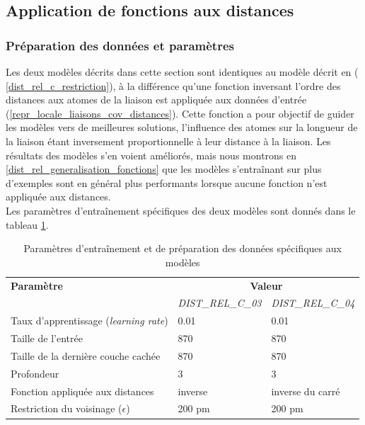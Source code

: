 \subsection{Application de fonctions aux distances}

\label{dist_rel_c_fun}

\subsubsection{Préparation des données et paramètres}
Les deux modèles décrits dans cette section sont identiques au modèle décrit en ( \ref{dist_rel_c_restriction}), à la différence qu'une fonction inversant l'ordre des distances aux atomes de la liaison est appliquée aux données d'entrée (\ref{repr_locale_liaisons_cov_distances}). Cette fonction a pour objectif de guider les modèles vers de meilleures solutions, l'influence des atomes sur la longueur de la liaison étant inversement proportionnelle à leur distance à la liaison. Les résultats des modèles s'en voient améliorés, mais nous montrons en \ref{dist_rel_generalisation_fonctions} que les modèles s'entraînant sur plus d'exemples sont en général plus performants lorsque aucune fonction n'est appliquée aux distances.\\
Les paramètres d'entraînement spécifiques des deux modèles sont donnés dans le tableau \ref{tparams_dist_rel_c_023}.

\begin{table}

	\centering
	\begin{tabular}{|l|l|l|}
		\hline
		\textbf{Paramètre} & \multicolumn{2}{|c|}{\textbf{Valeur}} \\ 
		 & \emph{DIST\_REL\_C\_03} & \emph{DIST\_REL\_C\_04} \\ \hline
		Taux d'apprentissage (\emph{learning rate}) & 0.01 & 0.01\\ \hline
		Taille de l'entrée & 870 & 870\\ \hline
		Taille de la dernière couche cachée & 870 & 870\\ \hline
		Profondeur & 3 & 3\\ \hline
		Fonction appliquée aux distances & inverse & inverse du carré\\ \hline
		Restriction du voisinage ($\epsilon$) & 200 pm & 200 pm\\ \hline
	\end{tabular}
	
	\caption{Paramètres d'entraînement et de préparation des données spécifiques aux modèles}
	\label{tparams_dist_rel_c_023}
\end{table}

